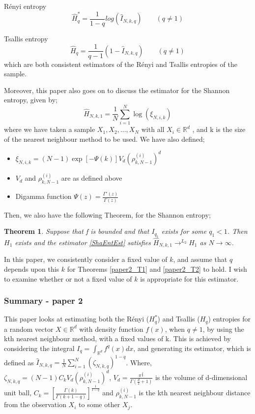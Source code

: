 \documentclass{article}
\newtheorem{theorem}{Theorem}
\begin{document}
R\'enyi entropy
\begin{equation}
\hat{H}_{q}^{*} = \frac{1}{1-q} log(\hat{I}_{N, k, q}) \quad  \quad (q \neq 1) \label{RenEnt} 
\end{equation}

Tsallis entropy
\begin{equation}
\hat{H}_{q} = \frac{1}{q-1} (1 - \hat{I}_{N, k, q}) \quad  \quad (q \neq 1) \label{TsaEnt} 
\end{equation}
which are both consistent estimators of the R\'enyi and Tsallis entropies of the sample.

Moreover, this paper also goes on to discuss the estimator for the Shannon entropy, given by;
\begin{equation} \label{ShaEntEst}
\hat{H}_{N, k, 1} = \frac{1}{N} \sum_{i=1}^{N} \log (\xi_{N, i, k})
\end{equation}
where we have taken a sample $X_{1}, X_{2}, ..., X_{N}$ with all $X_{i} \in \mathbb{R}^{d}$ , and k is the size of the nearest neighbour method to be used. We have also defined;
\begin{itemize}
\item $\xi_{N, i, k} = (N-1)\exp[-\Psi(k)]V_{d}(\rho_{k, N-1}^{(i)})^{d}$
\item $V_{d}$ and $\rho_{k, N-1}^{(i)}$ are as defined above
\item Digamma function $\Psi(z) = \frac{\Gamma'(z)}{\Gamma(z)}$
\end{itemize}
Then, we also have the following Theorem, for the Shannon entropy;
\begin{theorem} \label{paper2_T3}
Suppose that f is bounded and that $I_{q_{1}}$ exists for some $q_{1} < 1$. Then $H_{1}$ exists and the estimator \ref{ShaEntEst} satisfies $\hat{H}_{N, k, 1} \to^{L_{2}} H_{1}$ as $N \to \infty$.
\end{theorem}

In this paper, we consistently consider a fixed value of $k$, and assume that $q$ depends upon this $k$ for Theorems \ref{paper2_T1} and \ref{paper2_T2} to hold. I wish to examine whether or not a fixed value of $k$ is appropriate for this estimator.

\subsubsection{Summary - paper 2}

This paper looks at estimating both the R\'enyi ($H_{q}^{*}$) and Tsallis ($H_{q}$) entropies for a random vector $X \in \mathbb{R}^d$ with density function $f(x)$, when $q \neq 1$, by using the kth nearest neighbour method, with a fixed values of k. This is achieved by considering the integral  $I_{q} = \int_{\mathbb{R}^d} f^q (x) dx$, and generating its estimator, which is defined as $\hat{I}_{N, k, q} = \frac{1}{N} \sum_{i=1}^{N} (\zeta_{N, k, q})^{1-q}$. Where, $\zeta_{N, k ,q} = (N-1)C_{k}V_{d}(\rho_{k, N-1}^{(i)})^d$,  $V_{d} = \frac{\pi^{\frac{d}{2}}}{\Gamma(\frac{d}{2} + 1 )}$ is the volume of d-dimensional unit ball, $C_{k} = \left[ \frac{\Gamma(k)}{\Gamma(k+1-q)} \right]^{\frac{1}{1-q}}$ and $\rho_{k, N-1}^{(i)}$ is the kth nearest neighbour distance from the observation $X_{i}$ to some other $X_{j}$.
\end{document}
